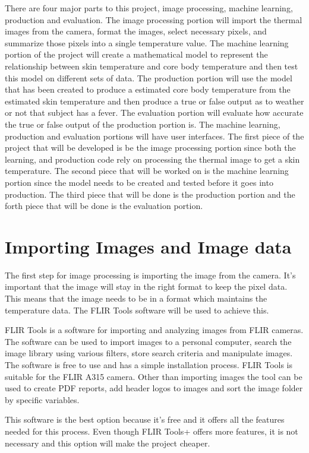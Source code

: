 \documentclass[onecolumn, draftclsnofoot,10pt, compsoc]{IEEEtran}
\begin{document}
There are four major parts to this project, image processing, machine learning, production and evaluation. The image processing portion will import the thermal images from the camera, format the images, select necessary pixels, and summarize those pixels into a single temperature value. The machine learning portion of the project will create a mathematical model to represent the relationship between skin temperature and core body temperature and then test this model on different sets of data. The production portion will use the model that has been created to produce a estimated core body temperature from the estimated skin temperature and then produce a true or false output as to weather or not that subject has a fever. The evaluation portion will evaluate how accurate the true or false output of the production portion is. The machine learning, production and evaluation portions will have user interfaces. The first piece of the project that will be developed is be the image processing portion since both the learning, and production code rely on processing the thermal image to get a skin temperature. The second piece that will be worked on is the machine learning portion since the model needs to be created and tested before it goes into production. The third piece that will be done is the production portion and the forth piece that will be done is the evaluation portion.


\section{Importing Images and Image data}

The first step for image processing is importing the image from the camera. It’s important that the image will stay in the right format to keep the pixel data. This means that the image needs to be in a format which maintains the temperature data. The FLIR Tools software will be used to achieve this. 

FLIR Tools is a software for importing and analyzing images from FLIR cameras. The software can be used to import images to a personal computer, search the image library using various filters, store search criteria and manipulate images. The software is free to use and has a simple installation process. FLIR Tools is suitable for the FLIR A315 camera. Other than importing images the tool can be used to create PDF reports, add header logos to images and sort the image folder by specific variables.\cite{ClaudeTech}

This software is the best option because it’s free and it offers all the features needed for this process. Even though FLIR Tools+ offers more features, it is not necessary and this option will make the project cheaper.
\end{document}
